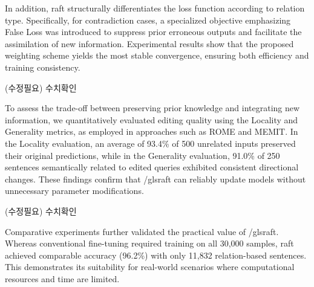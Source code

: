 \documentclass[a4paper,fleqn]{cas-sc}
\begin{document}
In addition, \gls{raft} structurally differentiates the loss function according to relation type. Specifically, for contradiction cases, a specialized objective emphasizing False Loss was introduced to suppress prior erroneous outputs and facilitate the assimilation of new information. Experimental results show that the proposed weighting scheme yields the most stable convergence, ensuring both efficiency and training consistency.

(수정필요) 수치확인

To assess the trade-off between preserving prior knowledge and integrating new information, we quantitatively evaluated editing quality using the Locality and Generality metrics, as employed in approaches such as ROME and MEMIT. In the Locality evaluation, an average of 93.4\% of 500 unrelated inputs preserved their original predictions, while in the Generality evaluation, 91.0\% of 250 sentences semantically related to edited queries exhibited consistent directional changes. These findings confirm that /gls{raft} can reliably update models without unnecessary parameter modifications.

(수정필요) 수치확인

Comparative experiments further validated the practical value of /gls{raft}. Whereas conventional fine-tuning required training on all 30,000 samples, \gls{raft} achieved comparable accuracy (96.2\%) with only 11,832 relation-based sentences. This demonstrates its suitability for real-world scenarios where computational resources and time are limited.
\end{document}
